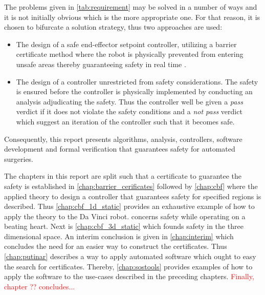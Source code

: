 The problems given in \autoref{tab:requirement} may be solved in a number of ways and it is not initially obvious which is the more appropriate one. For that reason, it is chosen to bifurcate a solution strategy, thus two approaches are used:
\begin{itemize}
\item The design of a safe end-effector setpoint controller, utilizing a barrier certificate method where the robot is physically prevented from entering unsafe areas thereby guaranteeing safety in real time \citep{bib:safety}. 
\item The design of a controller unrestricted from safety considerations. The safety is ensured before the controller is physically implemented by conducting an analysis adjudicating the safety. Thus the controller well be given a \textit{pass} verdict if it does not violate the safety conditions and a \textit{not pass} verdict which suggest an iteration of the controller such that it becomes safe. 
\end{itemize}
Consequently, this report presents algorithms, analysis, controllers, software development and formal verification that guarantees safety for automated surgeries.

The chapters in this report are split such that a certificate to guarantee the safety is established in \autoref{chap:barrier_cerificates} followed by \autoref{chap:cbf} where the applied theory to design a controller that guarantees safety for specified regions is described. Thus \autoref{chap:cbf_1d_static} provides an exhaustive example of how to apply the theory to the Da Vinci robot.  concerns safety while operating on a beating heart. Next is \autoref{chap:cbf_3d_static} which founds safety in the three dimensional space. An interim conclusion is given in \autoref{chap:interim} which concludes the need for an easier way to construct the certificates. Thus \autoref{chap:putinar} describes a way to apply automated software which ought to easy the search for certificates. Thereby, \autoref{chap:sostools} provides examples of how to apply the software to the use-cases described in the preceding chapters. \textcolor{red}{Finally, chapter ?? concludes...}





